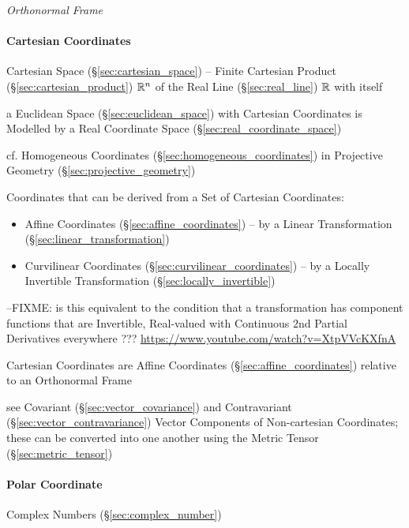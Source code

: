\emph{Orthonormal Frame}



\paragraph{Cartesian Coordinates}\label{sec:cartesian_coordinates}\hfill

Cartesian Space (\S\ref{sec:cartesian_space}) -- Finite Cartesian Product
(\S\ref{sec:cartesian_product}) $\mathbb{R}^n$ of the Real Line
(\S\ref{sec:real_line}) $\mathbb{R}$ with itself

a Euclidean Space (\S\ref{sec:euclidean_space}) with Cartesian Coordinates is
Modelled by a Real Coordinate Space (\S\ref{sec:real_coordinate_space})

cf. Homogeneous Coordinates (\S\ref{sec:homogeneous_coordinates}) in Projective
Geometry (\S\ref{sec:projective_geometry})

Coordinates that can be derived from a Set of Cartesian Coordinates:
\begin{itemize}
  \item Affine Coordinates (\S\ref{sec:affine_coordinates}) -- by a Linear
    Transformation (\S\ref{sec:linear_transformation})
  \item Curvilinear Coordinates (\S\ref{sec:curvilinear_coordinates}) -- by a
    Locally Invertible Transformation (\S\ref{sec:locally_invertible})
\end{itemize}

--FIXME: is this equivalent to the condition that a transformation has component
functions that are Invertible, Real-valued with Continuous $2$nd Partial
Derivatives everywhere ??? \url{https://www.youtube.com/watch?v=XtpVVcKXfnA}

Cartesian Coordinates are Affine Coordinates (\S\ref{sec:affine_coordinates})
relative to an Orthonormal Frame

see Covariant (\S\ref{sec:vector_covariance}) and Contravariant
(\S\ref{sec:vector_contravariance}) Vector Components of Non-cartesian
Coordinates; these can be converted into one another using the Metric Tensor
(\S\ref{sec:metric_tensor})



\paragraph{Polar Coordinate}\label{sec:polar_coordinates}\hfill

\fist Complex Numbers (\S\ref{sec:complex_number})



